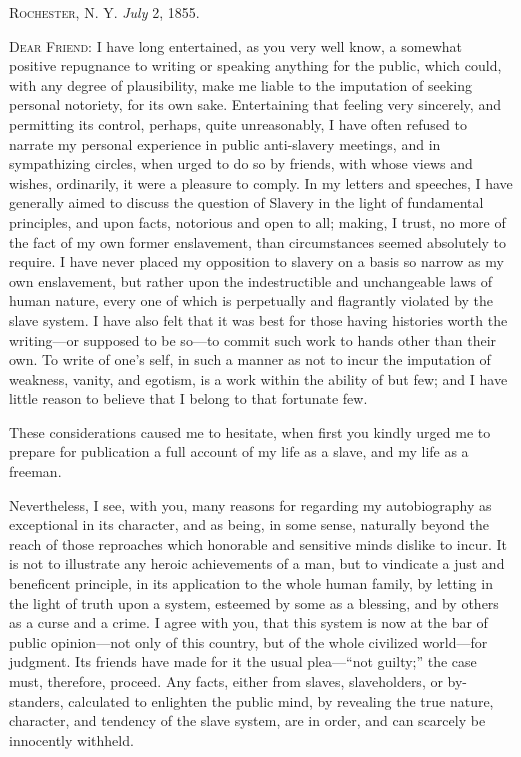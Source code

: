\textsc{Rochester}, N. Y. \emph{July} 2, 1855.

\textsc{Dear Friend}: I have long entertained, as you very well know, a
somewhat positive repugnance to writing or speaking anything for the
public, which could, with any degree of plausibility, make me liable to
the imputation of seeking personal notoriety, for its own sake.
Entertaining that feeling very sincerely, and permitting its control,
perhaps, quite unreasonably, I have often refused to narrate my personal
experience in public anti-slavery meetings, and in sympathizing circles,
when urged to do so by friends, with whose views and wishes, ordinarily,
it were a pleasure to comply. In my letters and speeches, I have
generally aimed to discuss the question of Slavery in the light of
fundamental principles, and upon facts, notorious and open to all;
making, I trust, no more of the fact of my own former enslavement, than
circumstances seemed absolutely to require. I have never placed my
opposition to slavery on a basis so narrow as my own enslavement, but
rather upon the indestructible and unchangeable laws of human nature,
every one of which is perpetually and flagrantly violated by the slave
system. I have also felt that it was best for those having histories
worth the writing---or supposed to be so---to commit such work to hands
other than their own. To write of one's self, in such a manner as not to
incur the imputation of weakness, vanity, and egotism, is a work within
the ability of but few; and I have little reason to believe that I
belong to that fortunate few.

These considerations caused me to hesitate, when first you
{\protect\hypertarget{vii}{}{}}kindly urged me to prepare for
publication a full account of my life as a slave, and my life as a
freeman.

Nevertheless, I see, with you, many reasons for regarding my
autobiography as exceptional in its character, and as being, in some
sense, naturally beyond the reach of those reproaches which honorable
and sensitive minds dislike to incur. It is not to illustrate any heroic
achievements of a man, but to vindicate a just and beneficent principle,
in its application to the whole human family, by letting in the light of
truth upon a system, esteemed by some as a blessing, and by others as a
curse and a crime. I agree with you, that this system is now at the bar
of public opinion---not only of this country, but of the whole civilized
world---for judgment. Its friends have made for it the usual
plea---``not guilty;'' the case must, therefore, proceed. Any facts,
either from slaves, slaveholders, or by-standers, calculated to
enlighten the public mind, by revealing the true nature, character, and
tendency of the slave system, are in order, and can scarcely be
innocently withheld.

